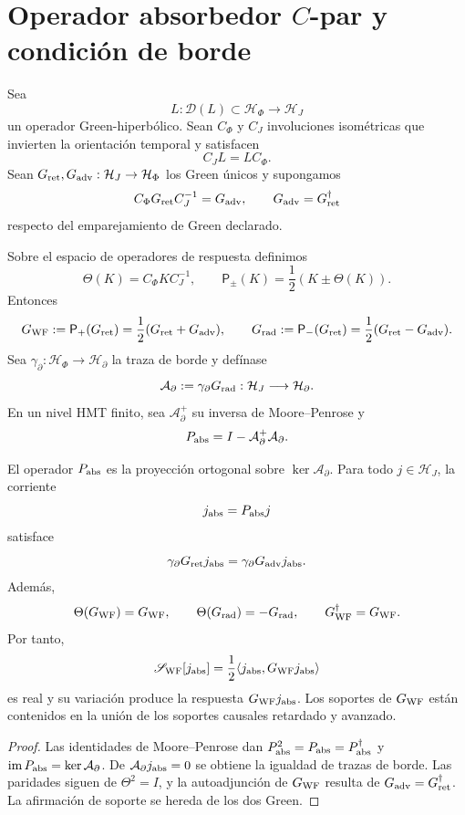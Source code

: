 \section{Operador absorbedor \(C\)-par y condición de borde}
\label{sec:hmtf2-absorbedor}

Sea
\[
 L:\mathcal D(L)\subset\mathcal H_\Phi\longrightarrow\mathcal H_J
\]
un operador Green-hiperbólico. Sean \(C_\Phi\) y \(C_J\) involuciones
isométricas que invierten la orientación temporal y satisfacen
\[
 C_J L=L C_\Phi.
\]
Sean \(G_{\rm ret},G_{\rm adv}:\mathcal H_J\to\mathcal H_\Phi\) los Green
únicos y supongamos
\[
 C_\Phi G_{\rm ret}C_J^{-1}=G_{\rm adv},
 \qquad
 G_{\rm adv}=G_{\rm ret}^{\dagger}
\]
respecto del emparejamiento de Green declarado.

Sobre el espacio de operadores de respuesta definimos
\[
 \Theta(K)=C_\Phi K C_J^{-1},\qquad
 \mathsf P_\pm(K)=\frac12(K\pm\Theta(K)).
\]
Entonces
\[
 G_{\rm WF}:=\mathsf P_+(G_{\rm ret})
 =\frac12(G_{\rm ret}+G_{\rm adv}),
 \qquad
 G_{\rm rad}:=\mathsf P_-(G_{\rm ret})
 =\frac12(G_{\rm ret}-G_{\rm adv}).
\]
Sea \(\gamma_\partial:\mathcal H_\Phi\to\mathcal H_\partial\) la traza de
borde y defínase
\[
 \mathcal A_\partial
 :=\gamma_\partial G_{\rm rad}:
 \mathcal H_J\longrightarrow\mathcal H_\partial.
\]
En un nivel HMT finito, sea \(\mathcal A_\partial^+\) su inversa de
Moore--Penrose y
\[
 P_{\rm abs}=I-\mathcal A_\partial^+\mathcal A_\partial.
\]

\begin{theorem}
\label{thm:hmtf2-absorbedor}
El operador \(P_{\rm abs}\) es la proyección ortogonal sobre
\(\ker\mathcal A_\partial\). Para todo \(j\in\mathcal H_J\), la corriente
\[
 j_{\rm abs}=P_{\rm abs}j
\]
satisface
\[
 \gamma_\partial G_{\rm ret}j_{\rm abs}
 =\gamma_\partial G_{\rm adv}j_{\rm abs}.
\]
Además,
\[
 \Theta(G_{\rm WF})=G_{\rm WF},\qquad
 \Theta(G_{\rm rad})=-G_{\rm rad},\qquad
 G_{\rm WF}^{\dagger}=G_{\rm WF}.
\]
Por tanto,
\[
 \mathscr S_{\rm WF}[j_{\rm abs}]
 =\frac12\langle j_{\rm abs},G_{\rm WF}j_{\rm abs}\rangle
\]
es real y su variación produce la respuesta \(G_{\rm WF}j_{\rm abs}\).
Los soportes de \(G_{\rm WF}\) están contenidos en la unión de los soportes
causales retardado y avanzado.
\end{theorem}

\begin{proof}
Las identidades de Moore--Penrose dan
\(P_{\rm abs}^2=P_{\rm abs}=P_{\rm abs}^{\dagger}\) y
\(\operatorname{im}P_{\rm abs}=\ker\mathcal A_\partial\). De
\(\mathcal A_\partial j_{\rm abs}=0\) se obtiene la igualdad de trazas de
borde. Las paridades siguen de \(\Theta^2=I\), y la autoadjunción de
\(G_{\rm WF}\) resulta de
\(G_{\rm adv}=G_{\rm ret}^{\dagger}\). La afirmación de soporte se hereda
de los dos Green.
\end{proof}

